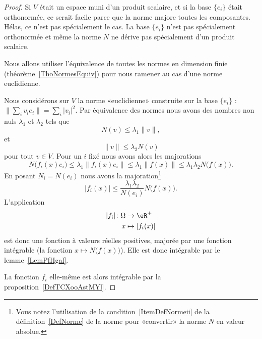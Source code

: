 \begin{proof}
    Si \( V\) était un espace muni d'un produit scalaire, et si la base \( \{ e_i \}\) était orthonormée, ce serait facile parce que la norme majore toutes les composantes. Hélas, ce n'est pas spécialement le cas. La base \( \{ e_i \}\) n'est pas spécialement orthonormée et même la norme \( N\) ne dérive pas spécialement d'un produit scalaire.

    Nous allons utiliser l'équivalence de toutes les normes en dimension finie (théorème~\ref{ThoNormesEquiv}) pour nous ramener au cas d'une norme euclidienne.

    Nous considérons sur \( V\) la norme «euclidienne» construite sur la base \( \{ e_i \}\) : \( \| \sum_iv_ie_i \|=\sum_i| v_i |^2\). Par équivalence des normes nous avons des nombres non nuls \( \lambda_1\) et \( \lambda_2\) tels que
    \begin{equation}
        N(v)\leq \lambda_1\| v \|,
    \end{equation}
    et
    \begin{equation}
        \| v \|\leq \lambda_2 N(v)
    \end{equation}
    pour tout \( v\in V\). Pour un \( i\) fixé nous avons alors les majorations
    \begin{equation}
        N\big( f_i(x)e_i \big)\leq \lambda_1\| f_i(x)e_i \|\leq \lambda_1\| f(x) \|\leq \lambda_1\lambda_2N\big( f(x) \big).
    \end{equation}
    En posant \( N_i=N(e_i)\) nous avons la majoration\footnote{Vous notez l'utilisation de la condition~\ref{ItemDefNormeii} de la définition~\ref{DefNorme} de la norme pour «convertir» la norme \( N\) en valeur absolue.}
    \begin{equation}
        | f_i(x) |\leq \frac{ \lambda_1\lambda_2 }{ N(e_i) }N\big( f(x) \big).
    \end{equation}
    L'application
    \begin{equation}
        \begin{aligned}
            | f_i |\colon \Omega&\to \eR^+ \\
            x&\mapsto | f_i(x) |
        \end{aligned}
    \end{equation}
    est donc une fonction à valeurs réelles positives, majorée par une fonction intégrable (la fonction \( x\mapsto N\big( f(x) \big)\)). Elle est donc intégrable par le lemme~\ref{LemPfHgal}.

    La fonction \( f_i\) elle-même est alors intégrable par la proposition~\ref{DefTCXooAstMYl}.
\end{proof}

